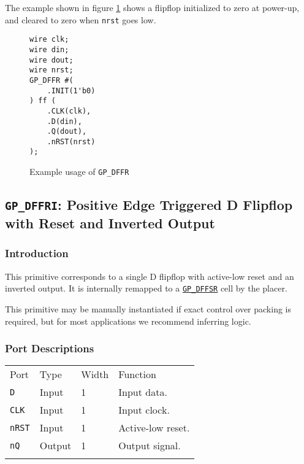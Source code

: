 \documentclass[11pt]{article}
\newcommand{\tokenstyle}[1]{\texttt{#1}}
\newcommand{\wirestyle}[1]{\texttt{#1}}
\newcommand{\whenstyle}[1]{{\fontseries{sb}\selectfont#1}}
\newcommand{\tokenref}[2]{\hyperref[#2]{\tokenstyle{#1}}}
\newcommand{\thinhline}{\Xhline{1\arrayrulewidth}}
\newcommand{\thickhline}{\Xhline{2.5\arrayrulewidth}}
\begin{document}
The example shown in figure \ref{gp-dffr-example} shows a flipflop initialized to zero at power-up, and cleared to zero
when \wirestyle{nrst} goes low.

\begin{figure}[h]
\begin{lstlisting}
wire clk;
wire din;
wire dout;
wire nrst;
GP_DFFR #(
	.INIT(1'b0)
) ff (
	.CLK(clk),
	.D(din),
	.Q(dout),
	.nRST(nrst)
);
\end{lstlisting}
\caption{Example usage of \tokenstyle{GP\_DFFR}}
\label{gp-dffr-example}
\end{figure}


\pagebreak
\subsection{\tokenstyle{GP\_DFFRI}: Positive Edge Triggered D Flipflop with Reset and Inverted Output}
\label{gp-dffr}

\subsubsection{Introduction}
This primitive corresponds to a single D flipflop with active-low reset and an inverted output. It is internally
remapped to a \tokenref{GP\_DFFSR}{gp-dffsr} cell by the placer.

This primitive may be manually instantiated if exact control over packing is required, but for most applications we
recommend inferring logic.

\subsubsection{Port Descriptions}

\begin{tabularx}{\textwidth}{lllX}
\thinhline
\whenstyle{Port} & \whenstyle{Type} & \whenstyle{Width} & \whenstyle{Function} \\
\thickhline
\tokenstyle{D} & Input & 1 & Input data. \\
\thinhline
\tokenstyle{CLK} & Input & 1 & Input clock. \\
\thinhline
\tokenstyle{nRST} & Input & 1 & Active-low reset. \\
\thinhline
\tokenstyle{nQ} & Output & 1 & Output signal. \\
\thinhline
\end{tabularx}
\end{document}
